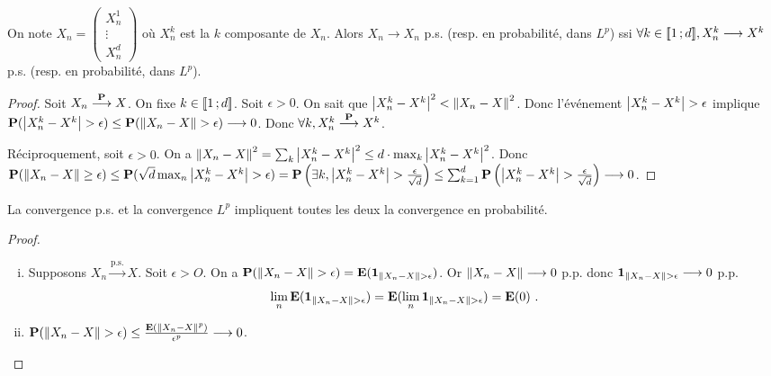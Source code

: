 	\begin{pop}
		On note $X_n = \begin{pmatrix} X_n^1 \\ \vdots \\ X_n^d \end{pmatrix}$ où $X_n^k$ est la $k$ composante de $X_n$.
		Alors $X_n \longrightarrow X_n$ p.s. (resp. en probabilité, dans $L^p$) ssi $\forall k \in \mathopen{[\![}1\mathclose{}\mathpunct{};d\mathclose{]\!]}, X_n^k \longrightarrow X^k$ p.s. (resp. en probabilité, dans $L^p$).
	\end{pop}

	\begin{proof}
		Soit $X_n \overset{\mathbf{P}}{\longrightarrow} X$.
		On fixe $k \in \mathopen{[\![}1\mathclose{}\mathpunct{};d\mathclose{]\!]}$.
		Soit $\epsilon > 0$.
		On sait que $\left\lvert X_n^k - X^k\right\rvert^2 < \left\lVert X_n - X\right\rVert^2$.
		Donc l'événement $\left\lvert X_n^k - X^k\right\rvert > \epsilon$ implique $\mathbf{P}(\left\lvert X_n^k - X^k\right\rvert > \epsilon) \leq \mathbf{P}(\left\lVert X_n - X\right\rVert > \epsilon) \longrightarrow 0$.
		Donc $\forall k, X_n^k \overset{\mathbf{P}}{\longrightarrow} X^k$.
		
		Réciproquement, soit $\epsilon > 0$.
		On a $\left\lVert X_n - X\right\rVert^2 = \sum_k \left\lvert X_n^k - X^k\right\rvert^2 \leq d \cdot \max_k \left\lvert X_n^k - X^k\right\rvert^2$.
		Donc $\mathbf{P}(\left\lVert X_n - X\right\rVert \geq \epsilon) \leq \mathbf{P}(\sqrt{d} \max_n \left\lvert X_n^k - X^k\right\rvert > \epsilon) = \mathbf{P} \left(\exists k, \left\lvert X_n^k - X^k\right\rvert > \frac{\epsilon}{\sqrt{d}} \right) \leq \sum_{k = 1}^d \mathbf{P} \left( \left\lvert X_n^k - X^k\right\rvert > \frac{\epsilon}{\sqrt{d}} \right) \longrightarrow 0$.
	\end{proof}

	\begin{pop}
		La convergence p.s. et la convergence $L^p$ impliquent toutes les deux la convergence en probabilité.
	\end{pop}

	\begin{proof}
		\begin{enumerate}[(i)]
			\item Supposons $X_n \overset{\text{p.s.}}{\longrightarrow} X$.
			Soit $\epsilon > O$.
			On a $\mathbf{P}(\left\lVert X_n - X\right\rVert > \epsilon) = \mathbf{E}(\operatorname{\mathbf{1}}_{\left\lVert X_n - X\right\rVert > \epsilon})$.
			Or $\left\lVert X_n - X\right\rVert \longrightarrow 0$ p.p. donc  $\operatorname{\mathbf{1}}_{\left\lVert X_n - X\right\rVert > \epsilon} \longrightarrow 0$ p.p.
			$$\lim_n \mathbf{E}(\operatorname{\mathbf{1}}_{\left\lVert X_n - X\right\rVert > \epsilon}) = \mathbf{E} (\lim_n \operatorname{\mathbf{1}}_{\left\lVert X_n - X\right\rVert > \epsilon}) = \mathbf{E}(0)\ .$$
			\item $\mathbf{P}(\left\lVert X_n - X\right\rVert > \epsilon) \leq \frac{\mathbf{E}(\left\lVert X_n - X\right\rVert^p)}{\epsilon^p} \longrightarrow 0$.
		\end{enumerate}
	\end{proof}

